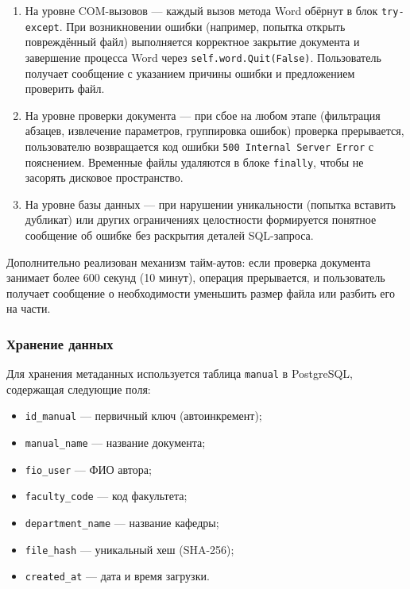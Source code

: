 \begin{enumerate}
	\item На уровне COM-вызовов — каждый вызов метода Word обёрнут в блок \texttt{try-except}. При возникновении ошибки (например, попытка открыть повреждённый файл) выполняется корректное закрытие документа и завершение процесса Word через \texttt{self.word.Quit(False)}. Пользователь получает сообщение с указанием причины ошибки и предложением проверить файл.
	
	\item На уровне проверки документа — при сбое на любом этапе (фильтрация абзацев, извлечение параметров, группировка ошибок) проверка прерывается, пользователю возвращается код ошибки \texttt{500 Internal Server Error} с пояснением. Временные файлы удаляются в блоке \texttt{finally}, чтобы не засорять дисковое пространство.
	
	\item На уровне базы данных — при нарушении уникальности (попытка вставить дубликат) или других ограничениях целостности формируется понятное сообщение об ошибке без раскрытия деталей SQL-запроса.
\end{enumerate}

Дополнительно реализован механизм тайм-аутов: если проверка документа занимает более 600 секунд (10 минут), операция прерывается, и пользователь получает сообщение о необходимости уменьшить размер файла или разбить его на части.

\subsubsection{Хранение данных}

Для хранения метаданных используется таблица \texttt{manual} в PostgreSQL, содержащая следующие поля:

\begin{itemize}
	\item \texttt{id\_manual} — первичный ключ (автоинкремент);
	\item \texttt{manual\_name} — название документа;
	\item \texttt{fio\_user} — ФИО автора;
	\item \texttt{faculty\_code} — код факультета;
	\item \texttt{department\_name} — название кафедры;
	\item \texttt{file\_hash} — уникальный хеш (SHA-256);
	\item \texttt{created\_at} — дата и время загрузки.
\end{itemize}

